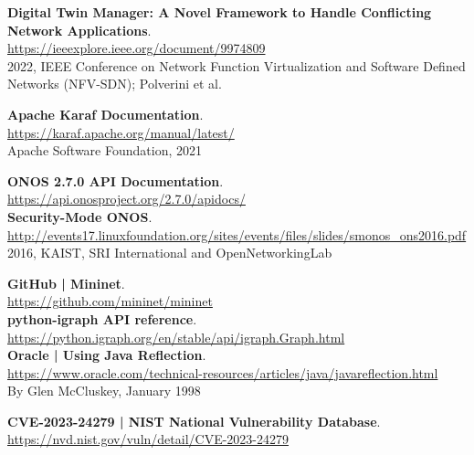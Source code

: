 \documentclass[a4paper,10pt]{memoir}
\begin{document}
{\begin{thebibliography}{9}
  \textbf{Digital Twin Manager: A Novel Framework to Handle Conflicting Network Applications}.\\
  \href{https://ieeexplore.ieee.org/document/9974809}{https://ieeexplore.ieee.org/document/9974809}\\
  2022, IEEE Conference on Network Function Virtualization and Software Defined Networks (NFV-SDN); Polverini et al.

  \textbf{Apache Karaf Documentation}.\\
  \href{https://karaf.apache.org/manual/latest/}{https://karaf.apache.org/manual/latest/}\\
  Apache Software Foundation, 2021

  \textbf{ONOS 2.7.0 API Documentation}.\\
  \href{https://api.onosproject.org/2.7.0/apidocs/}{https://api.onosproject.org/2.7.0/apidocs/}\\

  \textbf{Security-Mode ONOS}.\\
  \href{http://events17.linuxfoundation.org/sites/events/files/slides/smonos_ons2016.pdf}{http://events17.linuxfoundation.org/sites/events/files/slides/smonos\_ons2016.pdf}\\
  2016, KAIST, SRI International and OpenNetworkingLab

  \textbf{GitHub | Mininet}.\\
  \href{https://github.com/mininet/mininet}{https://github.com/mininet/mininet}\\

  \textbf{python-igraph API reference}.\\
  \href{https://python.igraph.org/en/stable/api/igraph.Graph.html}{https://python.igraph.org/en/stable/api/igraph.Graph.html}\\

  \textbf{Oracle | Using Java Reflection}.\\
  \href{https://www.oracle.com/technical-resources/articles/java/javareflection.html}{https://www.oracle.com/technical-resources/articles/java/javareflection.html}\\
  By Glen McCluskey, January 1998

  \textbf{CVE-2023-24279 | NIST National Vulnerability Database}.\\
  \href{https://nvd.nist.gov/vuln/detail/CVE-2023-24279}{https://nvd.nist.gov/vuln/detail/CVE-2023-24279}\\


\end{thebibliography}}
\end{document}
